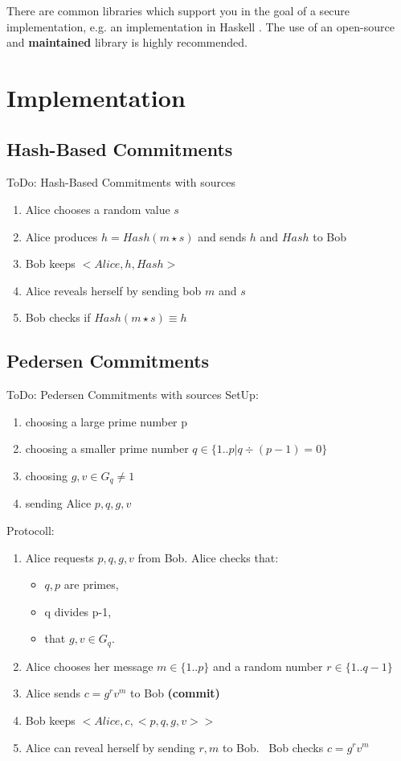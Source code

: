 \documentclass[conference]{IEEEtran}
\begin{document}
There are common libraries which support you in the goal of a secure implementation, e.g. an implementation in Haskell \cite{b0} . The use of an open-source and \textbf{maintained} library is highly recommended.
\section{Implementation}

\subsection{Hash-Based Commitments}
ToDo: Hash-Based Commitments with sources
	
	\begin{enumerate}
		\item Alice chooses a random value $s$
		\item Alice produces $h = Hash(m \star s)$ and sends $h$ and $Hash$ to Bob
		\item Bob keeps $<Alice,h,Hash>$
		\item Alice reveals herself by sending bob $m$ and $s$
		\item Bob checks if $Hash(m \star s) \equiv h$
	\end{enumerate}

\subsection{Pedersen Commitments}
ToDo: Pedersen Commitments with sources
SetUp:
	\begin{enumerate}
		\item choosing a large prime number p
		\item choosing a smaller prime number $q \in \{1..p| q\div (p-1) = 0\}$
		\item choosing $g,v \in G_q \neq 1$
		\item sending Alice $p,q,g,v$ 
	\end{enumerate}
Protocoll: 
	\begin{enumerate}
		\item Alice requests $p,q,g,v$ from Bob. \newline Alice checks that:
		\begin{itemize}
			\item $q,p$ are primes, 
			\item q divides p-1, 
			\item that $g,v \in G_q$. 
		\end{itemize}
		\item Alice chooses her message $m \in \{1..p\}$ and a random number $r \in \{1..q-1\}$
		\item Alice sends $c = g^rv^m$ to Bob \textbf{(commit)}
		\item Bob keeps $<Alice,c,<p,q,g,v>>$
		\item Alice can reveal herself by sending $r,m$ to Bob. ~\newline Bob checks $c = g^rv^m$
	\end{enumerate}
\end{document}
